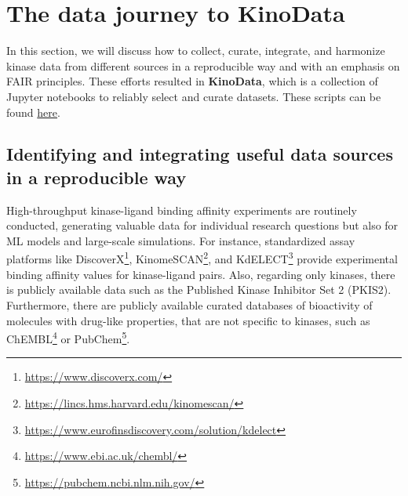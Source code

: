 \documentclass[9pt,lessons, pubversion]{livecoms}
\begin{document}
\section{The data journey to KinoData}
In this section, we will discuss how to collect, curate, integrate, and harmonize kinase data from different sources in a reproducible way and with an emphasis on FAIR principles. \cite{wilkinson2016fair} These efforts resulted in \textbf{KinoData}, which is a collection of Jupyter notebooks to reliably select and curate datasets. These scripts can be found \href{https://github.com/openkinome/kinodata}{here}.

\subsection{Identifying and integrating useful data sources in a reproducible way}

High-throughput kinase-ligand binding affinity experiments are routinely conducted, generating valuable data for individual research questions but also for ML models and large-scale simulations.
For instance, standardized assay platforms like DiscoverX\footnote{\href{https://www.discoverx.com/}{https://www.discoverx.com/}}, KinomeSCAN\footnote{\href{https://lincs.hms.harvard.edu/kinomescan/}{https://lincs.hms.harvard.edu/kinomescan/}}, and KdELECT\footnote{\href{https://www.eurofinsdiscovery.com/solution/kdelect}{https://www.eurofinsdiscovery.com/solution/kdelect}} provide experimental binding affinity values for kinase-ligand pairs. Also, regarding only kinases, there is publicly available data such as the Published Kinase Inhibitor Set 2 (PKIS2). \cite{drewry2017progress} 
Furthermore, there are publicly available curated databases of bioactivity of molecules with drug-like properties, that are not specific to kinases, such as ChEMBL\footnote{\href{https://www.ebi.ac.uk/chembl/}{https://www.ebi.ac.uk/chembl/}}\cite{zdrazil2024chembl} or PubChem\footnote{\href{https://pubchem.ncbi.nlm.nih.gov/}{https://pubchem.ncbi.nlm.nih.gov/}}.
\end{document}

